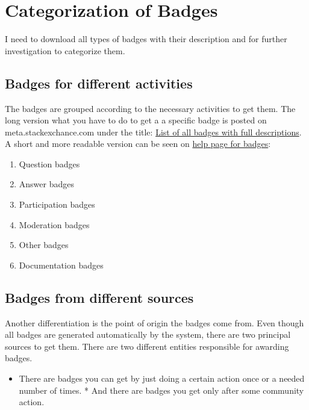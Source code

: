 \documentclass[]{book}
\providecommand{\tightlist}{%
  \setlength{\itemsep}{0pt}\setlength{\parskip}{0pt}}
\theoremstyle{definition}
\theoremstyle{definition}
\theoremstyle{definition}
\theoremstyle{remark}
\begin{document}
\section{Categorization of Badges}\label{categorization-of-badges}

I need to download all types of badges with their description and for
further investigation to categorize them.

\subsection{Badges for different
activities}\label{badges-for-different-activities}

The badges are grouped according to the necessary activities to get
them. The long version what you have to do to get a a specific badge is
posted on meta.stackexchance.com under the title:
\href{https://meta.stackexchange.com/questions/67397/list-of-all-badges-with-full-descriptions}{List
of all badges with full descriptions}. A short and more readable version
can be seen on \href{https://stackoverflow.com/help/badges}{help page
for badges}:

\begin{enumerate}
\def\labelenumi{\arabic{enumi})}
\tightlist
\item
  Question badges
\item
  Answer badges
\item
  Participation badges
\item
  Moderation badges
\item
  Other badges
\item
  Documentation badges
\end{enumerate}

\subsection{Badges from different
sources}\label{badges-from-different-sources}

Another differentiation is the point of origin the badges come from.
Even though all badges are generated automatically by the system, there
are two principal sources to get them. There are two different entities
responsible for awarding badges.

\begin{itemize}
\tightlist
\item
  There are badges you can get by just doing a certain action once or a
  needed number of times. * And there are badges you get only after some
  community action.
\end{itemize}
\end{document}
